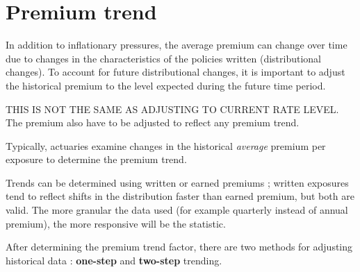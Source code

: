 \documentclass[11pt, english]{memoir}
\numberwithin{definition}{section}
\begin{document}
	\section{Premium trend}
	In addition to inflationary pressures, the average premium can change over time due to changes in the characteristics of the policies written (distributional changes). To account for future distributional changes, it is important to adjust the historical premium to the level expected during the future time period. 
	
	THIS IS NOT THE SAME AS ADJUSTING TO CURRENT RATE LEVEL. The premium also have to be adjusted to reflect any premium trend. 
	
	Typically, actuaries examine changes in the historical \emph{average} premium per exposure to determine the premium trend. 
	
	Trends can be determined using written or earned premiums ; written exposures tend to reflect shifts in the distribution faster than earned premium, but both are valid. The more granular the data used (for example quarterly instead of annual premium), the more responsive will be the statistic. 
	
	After determining the premium trend factor, there are two methods for adjusting historical data : \textbf{one-step} and \textbf{two-step} trending. 
	
	
	
	
	
	
	
	
	
	
	
	
	
	
	
	
	
	
	
	
	
	
	
	
	
	
	
	
	
	
	
	
	
	
	
	
	
	
	
	
\end{document}
